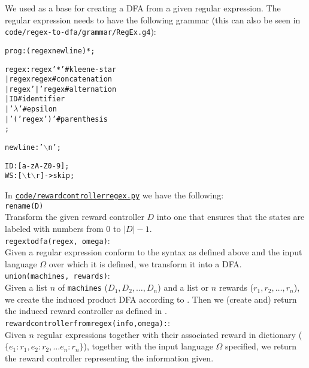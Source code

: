 We used \cite{g:regex-to-dfa} as a base for creating a DFA from a given regular expression. The regular expression needs to have the following grammar (this can also be seen in \texttt{code/regex-to-dfa/grammar/RegEx.g4}):
\begin{alltt}
prog : (regex newline)*;

regex : regex '*'      #kleene-star
  | regex regex	       #concatenation
  | regex '|' regex    #alternation
  | ID         	       #identifier
  | '\(\lambda\)'	   #epsilon
  | '(' regex ')'      #parenthesis
  ;

newline : '\(\backslash\)n{}';

ID: [a-zA-Z0-9];
WS: [\(\backslash\)t\(\backslash\)r ]->skip;
\end{alltt}

In \href{https://gitlab.science.ru.nl/srietbergen/thesis/-/blob/master/code/reward_controller_regex.py}{\texttt{code/reward\textunderscore controller\textunderscore regex.py}} we have the following:\\

\texttt{rename(D)}\\
Transform the given reward controller $D$ into one that ensures that the states are labeled with numbers from $0$ to $|D|-1$. \\

\texttt{regex\textunderscore to\textunderscore dfa(regex, omega)}:\\
Given a regular expression conform to the syntax as defined above and the input language $\Omega$ over which it is defined, we transform it into a DFA.\\

\texttt{union(machines, rewards)}:\\
Given a list $n$ of \texttt{machines} ($D_1,D_2,\dots, D_n$) and a list or $n$ rewards ($r_1,r_2,\dots, r_n$), we create the induced product DFA according to . Then we (create and) return the induced reward controller as defined in .\\

\texttt{reward\textunderscore controller\textunderscore from\textunderscore regex(info,omega):}:\\
Given $n$ regular expressions together with their associated reward in dictionary ($\{e_1 :r_1, e_2:r_2, \dots e_n:r_n\}$), together with the input language $\Omega$ specified, we return the reward controller representing the information given. 